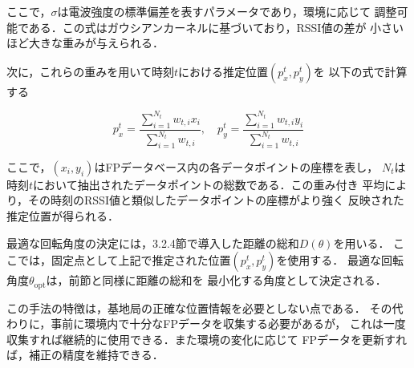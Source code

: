 ここで，$\sigma$は電波強度の標準偏差を表すパラメータであり，環境に応じて
調整可能である．この式はガウシアンカーネルに基づいており，RSSI値の差が
小さいほど大きな重みが与えられる．

次に，これらの重みを用いて時刻$t$における推定位置$(p_x^t, p_y^t)$を
以下の式で計算する

\begin{equation}
p_x^t = \frac{\sum_{i=1}^{N_t} w_{t,i} x_i}{\sum_{i=1}^{N_t} w_{t,i}}, \quad
p_y^t = \frac{\sum_{i=1}^{N_t} w_{t,i} y_i}{\sum_{i=1}^{N_t} w_{t,i}}
\end{equation}

ここで，$(x_i, y_i)$はFPデータベース内の各データポイントの座標を表し，
$N_t$は時刻$t$において抽出されたデータポイントの総数である．この重み付き
平均により，その時刻のRSSI値と類似したデータポイントの座標がより強く
反映された推定位置が得られる．

最適な回転角度の決定には，3.2.4節で導入した距離の総和$D(\theta)$を用いる．
ここでは，固定点として上記で推定された位置$(p_x^t, p_y^t)$を使用する．
最適な回転角度$\theta_{\mathrm{opt}}$は，前節と同様に距離の総和を
最小化する角度として決定される．

この手法の特徴は，基地局の正確な位置情報を必要としない点である．
その代わりに，事前に環境内で十分なFPデータを収集する必要があるが，
これは一度収集すれば継続的に使用できる．また環境の変化に応じて
FPデータを更新すれば，補正の精度を維持できる．



